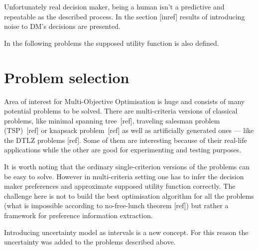 Unfortunately real decision maker, being a human isn't a predictive and
repeatable as the described process. In the section [inref] results of
introducing noise to DM's decisions are presented.

In the following problems the supposed utility function is also defined.

\section{Problem selection}

Area of interest for Multi-Objective Optimisation is huge and consists of many
potential problems to be solved. There are multi-criteria versions of
classical problems, like minimal spanning tree~[ref], traveling salesman
problem (TSP)~[ref] or knapsack problem~[ref] as well as artificially
generated ones --- like the DTLZ problems [ref]. Some of them are interesting
because of their real-life applications while the other are good for
experimenting and testing purposes.

It is worth noting that the ordinary single-criterion versions of the problems
can be easy to solve. However in multi-criteria setting one has to infer the
decision maker preferences and approximate supposed utility function
correctly. The challenge here is not to build the best optimisation algorithm
for all the problems (what is impossible according to no-free-lunch theorem
[ref]) but rather a framework for preference information extraction.

Introducing uncertainty model as intervals is a new concept. For this reason
the uncertainty was added to the problems described above.


